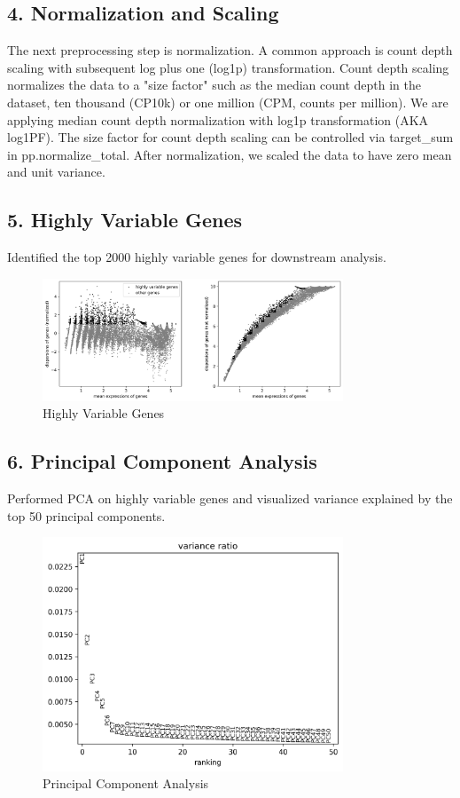 \documentclass[12pt]{article}
\begin{document}
\subsection{4. Normalization and Scaling}
The next preprocessing step is normalization. A common approach is count depth scaling with subsequent log plus one (log1p) transformation. Count depth scaling normalizes the data to a "size factor" such as the median count depth in the dataset, ten thousand (CP10k) or one million (CPM, counts per million). We are applying median count depth normalization with log1p transformation (AKA log1PF). The size factor for count depth scaling can be controlled via target\_sum in pp.normalize\_total. After normalization, we scaled the data to have zero mean and unit variance.

\subsection{5. Highly Variable Genes}
Identified the top 2000 highly variable genes for downstream analysis.

\begin{figure}[H]
    \centering
    \includegraphics[width=0.8\textwidth]{highly_variable_genes.png}
    \caption{Highly Variable Genes}
    \label{fig:highly_variable_genes}
\end{figure}

\subsection{6. Principal Component Analysis}
Performed PCA on highly variable genes and visualized variance explained by the top 50 principal components.

\begin{figure}[H]
    \centering
    \includegraphics[width=0.8\textwidth]{pca_variance.png}
    \caption{Principal Component Analysis}
    \label{fig:pca_variance}
\end{figure}
\end{document}
